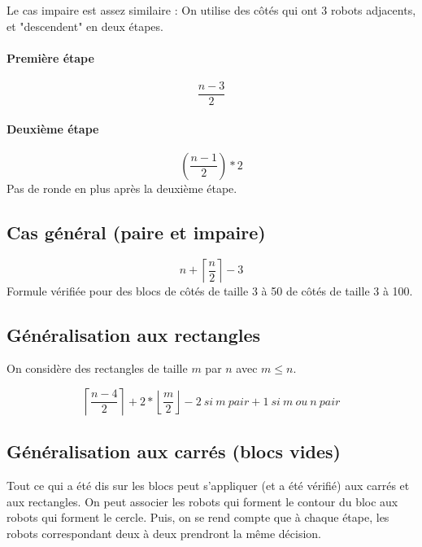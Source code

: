 \documentclass[11pt, a4paper]{article}
\begin{document}
Le cas impaire est assez similaire :
On utilise des côtés qui ont 3 robots adjacents, et "descendent" en deux
étapes.

\paragraph{Première étape}
\[ \frac{n-3}{2} \]

\paragraph{Deuxième étape}
\[ ( \frac{n-1}{2} ) *2 \]
Pas de ronde en plus après la deuxième étape.

\subsection{Cas général (paire et impaire)}
\[ n + \left\lceil \frac{n}{2} \right\rceil -3 \]
Formule vérifiée pour des blocs de côtés de taille 3 à 50 de côtés de taille 3
à 100.

\subsection{Généralisation aux rectangles}

On considère des rectangles de taille $m$ par $n$ avec $m \leq n$.

\[
    \left\lceil \frac{n-4}{2} \right\rceil
  + 2*\left\lfloor \frac{m}{2} \right\rfloor
  -2\ si\ m\ pair
  +1\ si\ m\ ou\ n\ pair
\]

\subsection{Généralisation aux carrés (blocs vides)}

Tout ce qui a été dis sur les blocs peut s'appliquer (et a été vérifié) aux
carrés et aux rectangles. On peut associer les robots qui forment le contour du
bloc aux robots qui forment le cercle. Puis, on se rend compte que à chaque
étape, les robots correspondant deux à deux prendront la même décision.
\end{document}
